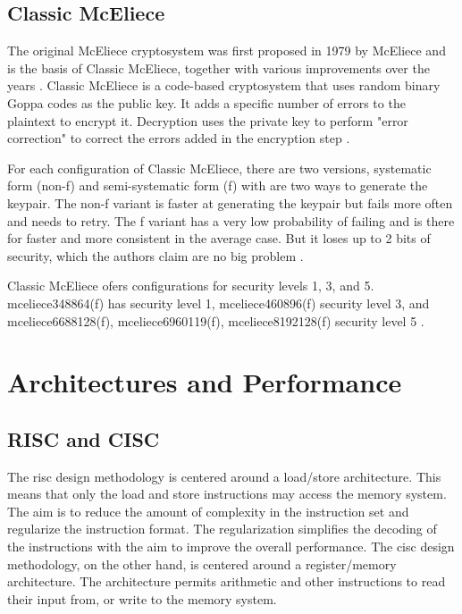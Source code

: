 \subsection{Classic McEliece}
\label{section:background:mceliece}
The original McEliece cryptosystem was first proposed in 1979 by McEliece \cite{mceliece1978} and is the basis of Classic McEliece, together with various improvements over the years  \cite{mceliece2020}. Classic McEliece is a code-based cryptosystem that uses random binary Goppa codes as the public key. It adds a specific number of errors to the plaintext to encrypt it. Decryption uses the private key to perform "error correction" to correct the errors added in the encryption step \cite{mceliece2020}.
 
For each configuration of Classic McEliece, there are two versions, systematic form (non-f) and semi-systematic form (f) with are two ways to generate the keypair. The non-f variant is faster at generating the keypair but fails more often and needs to retry. The f variant has a very low probability of failing and is there for faster and more consistent in the average case. But it loses up to 2 bits of security, which the authors claim are no big problem \cite{mceliece2020}.

Classic McEliece ofers configurations for security levels 1, 3, and 5. mceliece348864(f) has security level 1, mceliece460896(f) security level 3, and mceliece6688128(f), mceliece6960119(f), mceliece8192128(f) security level 5 \cite{mceliece2020}.

\section{Architectures and Performance}


\subsection{RISC and CISC}

The \acrfull{risc} design methodology is centered around a load/store architecture\cite{flynn1998}. This means that only the load and store instructions may access the memory system\cite{carter2002}. The aim is to reduce the amount of complexity in the instruction set and regularize the instruction format. The regularization simplifies the decoding of the instructions with the aim to improve the overall performance\cite{flynn1998}. The \acrfull{cisc} design methodology, on the other hand, is centered around a register/memory architecture\cite{flynn1998}. The architecture permits arithmetic and other instructions to read their input from, or write to the memory system\cite{carter2002}.

